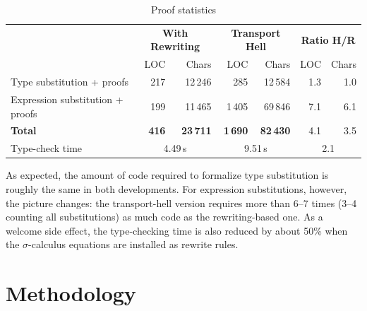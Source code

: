 \documentclass[manuscript,screen,review,anonymous,acmsmall]{acmart}
\begin{document}
\begin{table}[tp]
\begin{tabular}{|l|rr|rr||rr|}
  \hline
                                          & \multicolumn{2}{c|}{\textbf{With Rewriting}}
                                          & \multicolumn{2}{c||}{\textbf{Transport Hell}}
                                          & \multicolumn{2}{c|}{\textbf{Ratio H/R}} \\
                                          & LOC & Chars & LOC & Chars & LOC & Chars \\
  \hline
  Type substitution + proofs            &   217 &  12\,246
                                          &    285 &  12\,584
                                                & 1.3 & 1.0 \\
  Expression substitution + proofs      &   199 &  11\,465
                                          & 1\,405 &  69\,846
                                                & 7.1 & 6.1 \\
  \hline
  \textbf{Total}                        & \textbf{416} & \textbf{23\,711}
                                          & \textbf{1\,690} &
                                                              \textbf{82\,430}
                                                & 4.1 & 3.5 \\
  \hline
  Type-check time                       & \multicolumn{2}{c|}{4.49\,s}
                                          &
                                            \multicolumn{2}{c||}{9.51\,s}
                                          & \multicolumn{2}{c|}{2.1}\\
  \hline
\end{tabular}
\caption{Proof statistics}
\label{tab:proof-statistics}
\end{table}

As expected, the amount of code required to formalize type
substitution is roughly the same in both developments. For
expression substitutions, however, the picture changes:
the transport-hell version requires more than 6--7 times (3--4 counting
all substitutions) as much code
as the rewriting-based one. As a welcome side effect, the
type-checking time is also reduced by about 50\% when the
$\sigma$-calculus equations are installed as rewrite rules.

\section{Methodology}
\label{sec:going-further}
\end{document}
